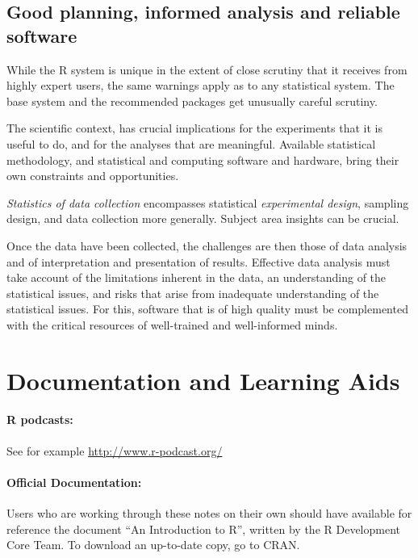\documentclass{tufte-book}\usepackage[]{graphicx}\usepackage[]{color}
\begin{document}
\subsection*{Good planning,  informed analysis and reliable software}

While the R system
 is unique in the extent of close
scrutiny that it receives from highly expert users, the same
warnings apply as to any statistical system.  The base system and
the recommended packages get unusually careful scrutiny.

  The scientific context, has crucial implications for the experiments
  that it is useful to do, and for the analyses that are meaningful.
  Available statistical methodology, and statistical and computing
  software and hardware, bring their own constraints and opportunities.

\textit{Statistics of data collection} encompasses statistical
\textit{experimental design}, sampling design, and data collection
more generally. Subject area insights can be crucial. 

Once the data have been collected, the challenges are then those of
data analysis and of interpretation and presentation of results. 
Effective data analysis must take account of the limitations
inherent in the data, an understanding of the statistical issues,
and 
risks that arise from inadequate understanding of the statistical
issues.
For
this, software that is of high quality must be complemented with the
critical resources of well-trained and well-informed minds.

\section*{Documentation and Learning Aids}
\paragraph{R podcasts:} See for example
\url{http://www.r-podcast.org/}

\paragraph{Official Documentation:}
Users who are working through these notes on their own should
have available for reference the document
``An Introduction to R'', written by the R Development Core Team.
To download an up-to-date copy, go to CRAN.
\end{document}
